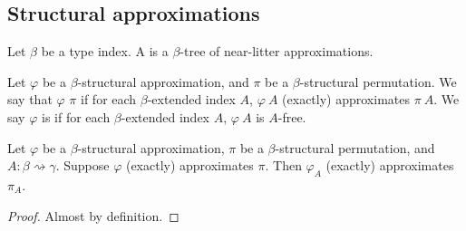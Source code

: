 \subsection{Structural approximations}
\begin{definition}
    Let \( \beta \) be a type index.
    A  is a \( \beta \)-tree of near-litter approximations.
\end{definition}
\begin{definition}
    Let \( \varphi \) be a \( \beta \)-structural approximation, and \( \pi \) be a \( \beta \)-structural permutation.
    We say that \( \varphi \)   \( \pi \) if for each \( \beta \)-extended index \( A \), \( \varphi\ A \) (exactly) approximates \( \pi\ A \).
    We say \( \varphi \) is  if for each \( \beta \)-extended index \( A \), \( \varphi\ A \) is \( A \)-free.
\end{definition}
\begin{lemma}
    Let \( \varphi \) be a \( \beta \)-structural approximation, \( \pi \) be a \( \beta \)-structural permutation, and \( A : \beta \rightsquigarrow \gamma \).
    Suppose \( \varphi \) (exactly) approximates \( \pi \).
    Then \( \varphi_A \) (exactly) approximates \( \pi_A \).
\end{lemma}
\begin{proof}
    Almost by definition.
\end{proof}
